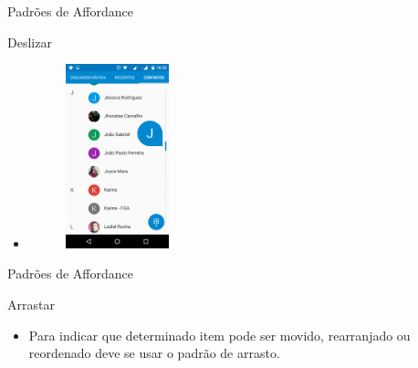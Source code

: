 \begin{frame}{Padrões de Affordance}
\begin{block}{Deslizar}
  \begin{itemize}
    \item<1-> \begin{figure}
    \includegraphics[width=3cm]{figuras/deslize/deslize5}
    \end{figure}
  \end{itemize}
\end{block}
\end{frame}

\begin{frame}{Padrões de Affordance}
\begin{block}{Arrastar}
  \begin{itemize}
    \item<1-> Para indicar que determinado item pode ser movido, rearranjado ou reordenado deve se usar o padrão de arrasto.
  \end{itemize}
\end{block}
\end{frame}
